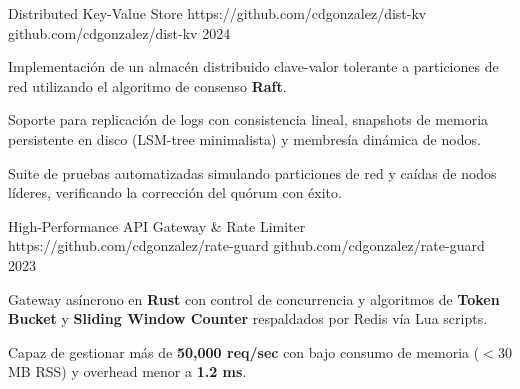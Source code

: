 %
%
%
%
%


\cvProjectItem
    {Distributed Key-Value Store}
    {https://github.com/cdgonzalez/dist-kv}
    {github.com/cdgonzalez/dist-kv}
    {}
    {2024}
    {
        \begin{cvItemize}
            \item Implementación de un almacén distribuido clave-valor tolerante a particiones de red utilizando el algoritmo de consenso \textbf{Raft}.
            \item Soporte para replicación de logs con consistencia lineal, snapshots de memoria persistente en disco (LSM-tree minimalista) y membresía dinámica de nodos.
            \item Suite de pruebas automatizadas simulando particiones de red y caídas de nodos líderes, verificando la corrección del quórum con éxito.
        \end{cvItemize}
    }

\cvProjectItem
    {High-Performance API Gateway \& Rate Limiter}
    {https://github.com/cdgonzalez/rate-guard}
    {github.com/cdgonzalez/rate-guard}
    {}
    {2023}
    {
        \begin{cvItemize}
            \item Gateway asíncrono en \textbf{Rust} con control de concurrencia y algoritmos de \textbf{Token Bucket} y \textbf{Sliding Window Counter} respaldados por Redis vía Lua scripts.
            \item Capaz de gestionar más de \textbf{50,000 req/sec} con bajo consumo de memoria ($<30$ MB RSS) y overhead menor a \textbf{1.2 ms}.
        \end{cvItemize}
    }

